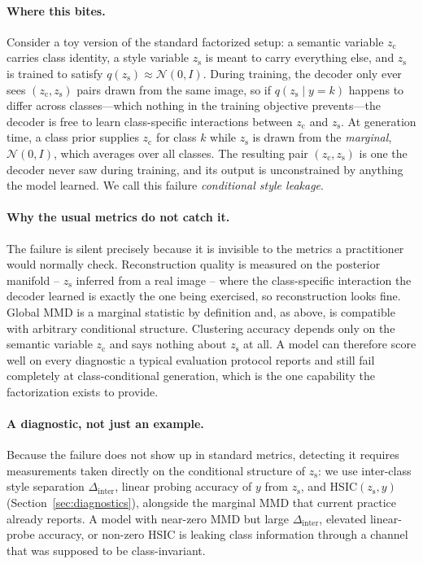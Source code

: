\documentclass[10pt,letterpaper]{article}
\newcommand{\zc}{z_{\mathrm{c}}}
\newcommand{\zs}{z_{\mathrm{s}}}
\begin{document}
\paragraph{Where this bites.}
Consider a toy version of the standard factorized setup: a semantic
variable $\zc$ carries class identity, a style variable $\zs$ is meant to
carry everything else, and $\zs$ is trained to satisfy
$q(\zs)\approx\mathcal N(0,I)$. During training, the decoder only ever sees
$(\zc,\zs)$ pairs drawn from the same image, so if $q(\zs\mid y{=}k)$
happens to differ across classes---which nothing in the training objective
prevents---the decoder is free to learn class-specific interactions between
$\zc$ and $\zs$. At generation time, a class prior supplies $\zc$ for class
$k$ while $\zs$ is drawn from the \emph{marginal}, $\mathcal N(0,I)$, which
averages over all classes. The resulting pair $(\zc,\zs)$ is one the decoder
never saw during training, and its output is unconstrained by anything the
model learned. We call this failure \emph{conditional style leakage}.

\paragraph{Why the usual metrics do not catch it.}
The failure is silent precisely because it is invisible to the metrics a
practitioner would normally check. Reconstruction quality is measured on
the posterior manifold -- $\zs$ inferred from a real image -- where the
class-specific interaction the decoder learned is exactly the one being
exercised, so reconstruction looks fine. Global MMD is a marginal statistic
by definition and, as above, is compatible with arbitrary conditional
structure. Clustering accuracy depends only on the semantic variable $\zc$
and says nothing about $\zs$ at all. A model can therefore score well on
every diagnostic a typical evaluation protocol reports and still fail
completely at class-conditional generation, which is the one capability the
factorization exists to provide.

\paragraph{A diagnostic, not just an example.}
Because the failure does not show up in standard metrics, detecting it
requires measurements taken directly on the conditional structure of $\zs$:
we use inter-class style separation $\Delta_{\mathrm{inter}}$, linear
probing accuracy of $y$ from $\zs$, and HSIC$(\zs,y)$
(Section~\ref{sec:diagnostics}), alongside the marginal MMD that current
practice already reports. A model with near-zero MMD but large
$\Delta_{\mathrm{inter}}$, elevated linear-probe accuracy, or non-zero HSIC
is leaking class information through a channel that was supposed to be
class-invariant.
\end{document}
